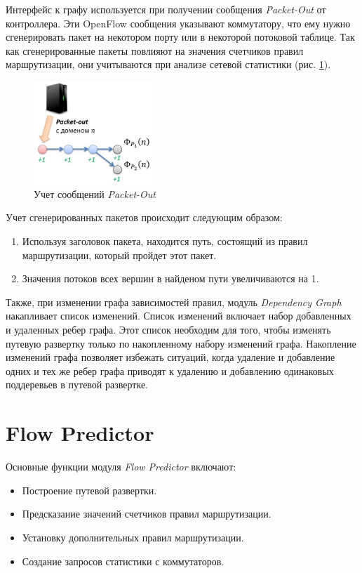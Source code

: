 \documentclass[../thesis.tex]{subfiles}
\begin{document}
Интерфейс к графу используется при получении сообщения \textit{Packet-Out} от контроллера.
Эти OpenFlow сообщения указывают коммутатору, что ему нужно сгенерировать пакет на некотором порту или в некоторой потоковой таблице.
Так как сгенерированные пакеты повлияют на значения счетчиков правил маршрутизации, они учитываются при анализе сетевой статистики (рис. \ref{fig:packetout}).

\begin{figure}
\centering
\includegraphics[width=0.4\textwidth]{figures/packetout.jpg}
\caption{Учет сообщений \textit{Packet-Out}} \label{fig:packetout}
\end{figure}

Учет сгенерированных пакетов происходит следующим образом:
\begin{enumerate}
\item Используя заголовок пакета, находится путь, состоящий из правил маршрутизации, который пройдет этот пакет.
\item Значения потоков всех вершин в найденом пути увеличиваются на 1.
\end{enumerate}

Также, при изменении графа зависимостей правил, модуль \textit{Dependency Graph} накапливает список изменений.
Список изменений включает набор добавленных и удаленных ребер графа.
Этот список необходим для того, чтобы изменять путевую развертку только по накопленному набору изменений графа.
Накопление изменений графа позволяет избежать ситуаций, когда удаление и добавление одних и тех же ребер графа приводят к удалению и добавлению одинаковых поддеревьев в путевой развертке.

\section{Flow Predictor}

Основные функции модуля \textit{Flow Predictor} включают:
\begin{itemize}
\item Построение путевой развертки.
\item Предсказание значений счетчиков правил маршрутизации.
\item Установку дополнительных правил маршрутизации.
\item Создание запросов статистики с коммутаторов.
\end{itemize}
\end{document}
